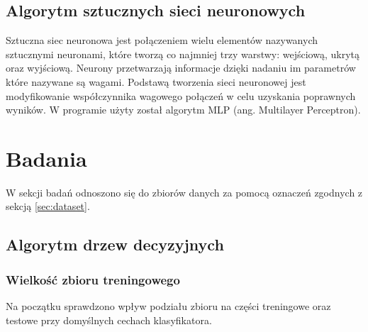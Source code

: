 \documentclass[a4paper,11pt]{article}
\begin{document}
\subsection{Algorytm sztucznych sieci neuronowych}
Sztuczna siec neuronowa  jest połączeniem wielu elementów nazywanych sztucznymi neuronami, które tworzą co najmniej trzy warstwy: wejściową, ukrytą oraz wyjściową. Neurony przetwarzają informacje dzięki nadaniu im parametrów które nazywane są wagami. Podstawą tworzenia sieci neuronowej jest modyfikowanie współczynnika wagowego połączeń w celu uzyskania poprawnych wyników. W programie użyty został algorytm MLP (ang. Multilayer Perceptron).


\section{Badania}

W sekcji badań odnoszono się do zbiorów danych za pomocą oznaczeń zgodnych z sekcją \ref{sec:dataset}.

\subsection{Algorytm drzew decyzyjnych}

\subsubsection*{Wielkość zbioru treningowego}

Na początku sprawdzono wpływ podziału zbioru na części treningowe oraz testowe przy domyślnych cechach klasyfikatora.
\end{document}
